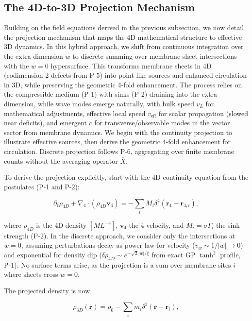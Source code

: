 \subsection{The 4D-to-3D Projection Mechanism}
\label{sec:projection}

Building on the field equations derived in the previous subsection, we now detail the projection mechanism that maps the 4D mathematical structure to effective 3D dynamics. In this hybrid approach, we shift from continuous integration over the extra dimension $w$ to discrete summing over membrane sheet intersections with the $w=0$ hypersurface. This transforms membrane sheets in 4D (codimension-2 defects from P-5) into point-like sources and enhanced circulation in 3D, while preserving the geometric 4-fold enhancement. The process relies on the compressible medium (P-1) with sinks (P-2) draining into the extra dimension, while wave modes emerge naturally, with bulk speed $v_L$ for mathematical adjustments, effective local speed $v_{\text{eff}}$ for scalar propagation (slowed near deficits), and emergent $c$ for transverse/observable modes in the vector sector from membrane dynamics. We begin with the continuity projection to illustrate effective sources, then derive the geometric 4-fold enhancement for circulation. Discrete projection follows P-6, aggregating over finite membrane counts without the averaging operator $\overline{X}$.

To derive the projection explicitly, start with the 4D continuity equation from the postulates (P-1 and P-2):

\begin{equation}
\partial_t \rho_{4D} + \nabla_4 \cdot (\rho_{4D} \mathbf{v}_4) = -\sum_i \dot{M}_i \delta^4(\mathbf{r}_4 - \mathbf{r}_{4,i}),
\end{equation}

where $\rho_{4D}$ is the 4D density $[M L^{-4}]$, $\mathbf{v}_4$ the 4-velocity, and $\dot{M}_i = \sigma \Gamma_i$ the sink strength (P-2). In the discrete approach, we consider only the intersections at $w=0$, assuming perturbations decay as power law for velocity ($v_w \sim 1/|w| \to 0$) and exponential for density dip ($\delta \rho_{4D} \sim e^{-\sqrt{2} |w|/\xi}$ from exact GP $\tanh^2$ profile, P-1). No surface terms arise, as the projection is a sum over membrane sites $i$ where sheets cross $w=0$.

The projected density is now

\[
\rho_{3D}(\mathbf{r}) = \rho_0 - \sum_i m_i \delta^3(\mathbf{r} - \mathbf{r}_i),
\]

